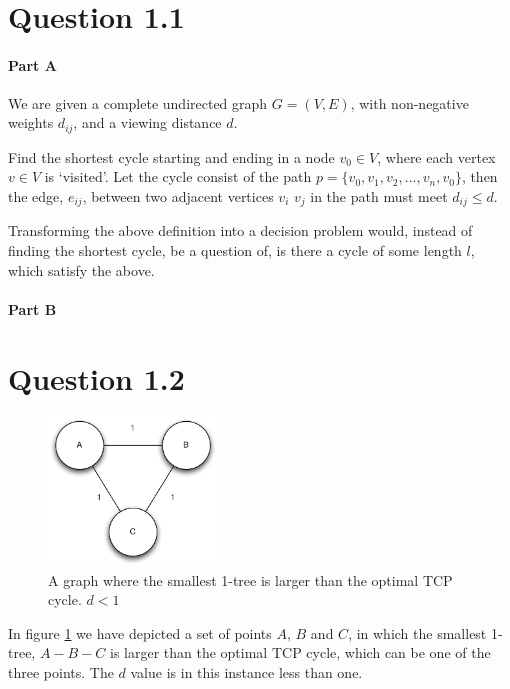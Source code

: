 \documentclass[10pt]{article}
\author{\authorName \\\texttt{\small{\authorEmail}}}
\title{\textsc{\titleName \\ \courseName}}
\begin{document}
\maketitle    

\section*{Question 1.1} %
\label{sec:question_1_1}
\paragraph{Part A} %
\label{par:part_a}

We are given a complete undirected graph $G = (V,E)$, with non-negative weights $d_{ij}$, and a viewing distance $d$. 

Find the shortest cycle starting and ending in a node $v_0 \in V$, where each vertex $v \in V$ is `visited'. Let the cycle consist of the path $p = \{v_0, v_1,v_2,...,v_n, v_0\}$, then the edge, $e_{ij}$, between two adjacent vertices $v_i$ $v_j$ in the path must meet $d_{ij}\leq d$. 

Transforming the above definition into a decision problem would, instead of finding the shortest cycle, be a question of, is there a cycle of some length $l$, which satisfy the above.




\paragraph{Part B} %
\label{par:part_b}


\section*{Question 1.2} %
\label{sec:question_1_2}

\begin{figure}
	\centering
	\includegraphics[width=0.4\textwidth]{figures/unicycle.pdf}
	\caption{A graph where the smallest 1-tree is larger than the optimal TCP cycle. $d<1$}
	\label{unicycle}
\end{figure}
In figure \ref{unicycle} we have depicted a set of points $A$, $B$ and $C$, in which the smallest 1-tree, $A-B-C$ is larger than the optimal TCP cycle, which can be one of the three points.
The $d$ value is in this instance less than one.
\end{document}
